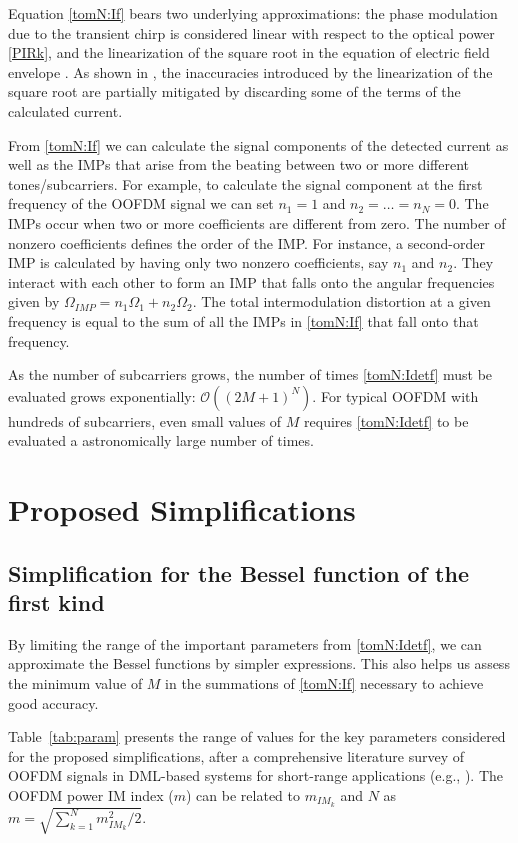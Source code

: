 \documentclass[journal]{IEEEtran}
\begin{document}
Equation \eqref{tomN:If} bears two underlying approximations: the phase modulation due to the transient chirp is considered linear with respect to the optical power \eqref{PIRk}, and the linearization of the square root in the equation of electric field envelope \cite[eq. 3]{eva}. As shown in \cite{comments}, the inaccuracies introduced by the linearization of the square root are partially mitigated by discarding some of the terms of the calculated current.

From \eqref{tomN:If} we can calculate the signal components of the detected current as well as the IMPs that arise from the beating between two or more different tones/subcarriers. For example, to calculate the signal component at the first frequency of the OOFDM signal we can set $n_1 = 1$ and $n_2 = \ldots = n_N = 0$. The IMPs occur when two or more coefficients are different from zero. The number of nonzero coefficients defines the order of the IMP. For instance, a second-order IMP is calculated by having only two nonzero coefficients, say $n_1$ and $n_2$. They interact with each other to form an IMP that falls onto the angular frequencies given by $\Omega_{IMP} = n_1\Omega_1 + n_2\Omega_2$. The total intermodulation distortion at a given frequency is equal to the sum of all the IMPs in \eqref{tomN:If} that fall onto that frequency.

As the number of subcarriers grows, the number of times \eqref{tomN:Idetf} must be evaluated grows exponentially: $\mathcal{O}((2M + 1)^N)$. For typical OOFDM with hundreds of subcarriers, even small values of $M$ requires \eqref{tomN:Idetf} to be evaluated a astronomically large number of times.
\section{Proposed Simplifications} \label{sec:simpl}
\subsection{Simplification for the Bessel function of the first kind} \label{sec:simpl1}
By limiting the range of the important parameters from \eqref{tomN:Idetf}, we can approximate the Bessel functions by simpler expressions. This also helps us assess the minimum value of $M$ in the summations of \eqref{tomN:If} necessary to achieve good accuracy.

Table~\ref{tab:param} presents the range of values for the key parameters considered for the proposed simplifications, after a comprehensive literature survey of OOFDM signals in DML-based systems for short-range applications (e.g., \cite{OFDM-GbE-UWB, equalization, evaOFDM}). The OOFDM power IM index ($m$) can be related to $m_{IM_k}$ and $N$ as $m = \sqrt{\sum_{k=1}^N m_{IM_k}^2/2}$. 
\end{document}
